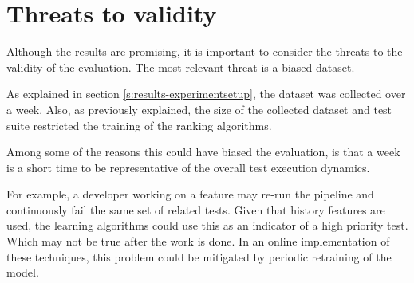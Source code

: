 \section{Threats to validity}\label{s:conclusion-threats}

Although the results are promising, it is important to consider
the threats to the validity of the evaluation. The most relevant threat 
is a biased dataset.

As explained in section \ref{s:results-experimentsetup}, the dataset was 
collected over a week. Also, as previously explained, the size of 
the collected dataset and test suite restricted the training of the ranking
algorithms.

Among some of the reasons this could have biased the evaluation, is that
a week is a short time to be representative of the overall test execution dynamics.

For example, a developer working on a feature may re-run the pipeline and continuously
fail the same set of related tests. Given that history features are used, the learning algorithms
could use this as an indicator of a high priority test. Which may not be true after the 
work is done. In an online implementation of these techniques, this problem
could be mitigated by periodic retraining of the model.

